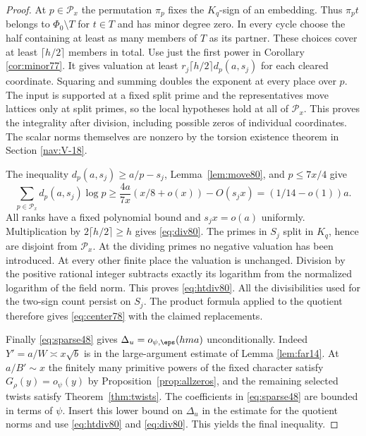 \documentclass[a4paper,11pt]{article}
\theoremstyle{definition}
\theoremstyle{remark}
\numberwithin{equation}{section}
\begin{document}
\begin{proof}
At \(p\in\mathcal P_x\) the permutation \(\pi_p\) fixes the
\(K_q\)-sign of an embedding. Thus \(\pi_p t\) belongs to
\(\Phi_0\setminus T\) for \(t\in T\) and has minor degree
zero. In every cycle choose the half containing at least as
many members of \(T\) as its partner. These choices cover
at least \(\lceil h/2\rceil\) members in total. Use just the
first power in
Corollary \ref{cor:minor77}.
It gives valuation at least
\(r_j\lceil h/2\rceil d_p(a,s_j)\) for each cleared coordinate.
Squaring and summing doubles the exponent at every place over
\(p\). The input is supported at a fixed split prime and the
representatives move lattices only at split primes, so the
local hypotheses hold at all of \(\mathcal P_x\). This proves
the integrality after division, including possible zeros of
individual coordinates. The scalar norms themselves are nonzero
by the torsion existence theorem in Section \ref{nav:V-18}.

The inequality \(d_p(a,s_j)\ge a/p-s_j\), Lemma~\ref{lem:move80},
and \(p\le7x/4\) give
\[
 \sum_{p\in\mathcal P_x}d_p(a,s_j)\log p
       \ge \frac{4a}{7x}(x/8+o(x))-O(s_j x)
       = (1/14-o(1))a.
\]
All ranks have a fixed polynomial bound and \(s_jx=o(a)\)
uniformly. Multiplication by \(2\lceil h/2\rceil\ge h\)
gives \eqref{eq:div80}. The primes in \(S_j\) split in
\(K_q\), hence are disjoint from \(\mathcal P_x\). At the
dividing primes no negative valuation has been introduced.
At every other finite place the valuation is unchanged.
Division by the positive rational integer subtracts exactly
its logarithm from the normalized logarithm of the field norm.
This proves \eqref{eq:htdiv80}. All the divisibilities used for
the two-sign count persist on \(S_j\). The product formula
applied to the quotient therefore gives \eqref{eq:center78}
with the claimed replacements.

Finally \eqref{eq:sparse48} gives \(\Delta_u=o_{\psi,\eps}(hma)\)
unconditionally. Indeed \(Y'=a/W\asymp x\sqrt b\) is in the
large-argument estimate of Lemma \ref{lem:far14}. At \(a/B'\sim x\)
the finitely many primitive powers of the fixed character satisfy
\(G_\rho(y)=o_\psi(y)\) by Proposition~\ref{prop:allzeros},
and the remaining selected twists satisfy Theorem~\ref{thm:twists}.
The coefficients in \eqref{eq:sparse48} are bounded in terms
of \(\psi\). Insert this lower bound on \(\Delta_u\) in the
estimate for the quotient norms and use \eqref{eq:htdiv80}
and \eqref{eq:div80}. This yields the final inequality.
\end{proof}
\end{document}
